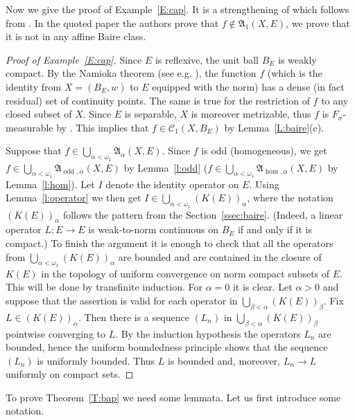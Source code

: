 \documentclass{amsart}
\numberwithin{equation}{section}
\theoremstyle{definition}
\def\fra{\mathfrak{A}}
\def\C{\mathcal C}
\def\hom{\operatorname{hom}}
\def\odd{\operatorname{odd}}
\begin{document}
Now we give the proof of Example~\ref{E:cap}. It is a strengthening of \cite[Example 2.22]{MeSta} which follows from \cite[Proposition 2.21]{MeSta}. In the quoted paper the authors prove that $f\notin\fra_1(X,E)$, we prove that it is
not in any affine Baire class.

\begin{proof}[Proof of Example~\ref{E:cap}]
Since $E$ is reflexive, the unit ball $B_E$ is weakly compact. By the Namioka theorem (see e.g. \cite[Corollary 14.4]{hhz}), the function $f$ (which is the identity from $X=(B_E,w)$ to $E$ equipped with the norm) has a dense (in fact residual) set of continuity points. The same is true for the restriction of $f$ to any closed subset of $X$. Since $E$ is separable, $X$ is moreover metrizable, thus $f$ is $F_\sigma$-measurable by \cite[\S31, X, Theorem 2]{kuratowski}. This implies that $f\in \C_1(X,B_E)$ by Lemma~\ref{L:baire}(c).

Suppose that $f\in\bigcup_{\alpha<\omega_1}\fra_\alpha(X,E)$. Since $f$ is odd (homogeneous), we get $f\in \bigcup_{\alpha<\omega_1}\fra_{\odd,\alpha}(X,E)$ by Lemma~\ref{l:odd} ($f\in \bigcup_{\alpha<\omega_1}\fra_{\hom,\alpha}(X,E)$ by Lemma~\ref{l:hom}).
Let $I$ denote the identity operator on $E$. Using Lemma~\ref{l:operator} we then get
$I\in\bigcup_{\alpha<\omega_1}(K(E))_\alpha$, where the notation $(K(E))_\alpha$ follows the pattern from the Section~\ref{ssec:baire}. (Indeed, a linear operator $L:E\to E$ is weak-to-norm continuous on $B_E$ if and only if it is compact.)
To finish the argument it is enough to check that all the operators from $\bigcup_{\alpha<\omega_1}(K(E))_\alpha$ are bounded and are contained in the closure of $K(E)$ in the topology of uniform convergence on norm compact subsets of $E$. This will be done by transfinite induction. For $\alpha=0$ it is clear. Let $\alpha>0$ and suppose that the assertion is valid for each operator in $\bigcup_{\beta<\alpha}(K(E))_\beta$. Fix $L\in (K(E))_\alpha$. Then there is
a sequence $(L_n)$ in $\bigcup_{\beta<\alpha}(K(E))_\beta$ pointwise converging to $L$. By the induction hypothesis the operators $L_n$ are bounded,
hence the uniform boundedness principle shows that the sequence $(L_n)$ is uniformly bounded. Thus $L$ is bounded and, moreover, $L_n\to L$ uniformly on compact sets.
\end{proof}

To prove Theorem~\ref{T:bap} we need some lemmata. Let us first introduce some notation.
\end{document}
